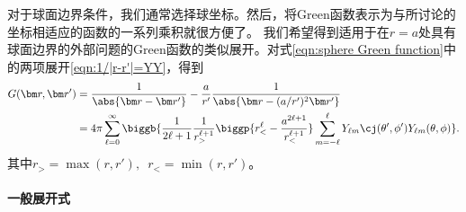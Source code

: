 对于球面边界条件，我们通常选择球坐标。然后，将Green函数表示为与所讨论的坐标相适应的函数的一系列乘积就很方便了。
我们希望得到适用于在$r = a$处具有球面边界的外部问题的Green函数的类似展开。对式\eqref{eqn:sphere Green function}中的两项展开\eqref{eqn:1/|r-r'|=YY}，得到
\begin{align}
    \notag
    G(\bm r,\bm r')&=\frac1{\abs{\bm r-\bm r'}}-\frac a{r'}\frac1{\abs{\bm r-(a/r')^2\bm r'}}\\
    \label{eqn:Green YY}
    &=4\pi\sum_{\ell=0}^\infty\biggb{\frac1{2\ell+1}\frac1{r_>^{\ell+1}}\biggp{r_<^\ell-\frac{a^{2\ell+1}}{r_<^{\ell+1}}}\sum_{m=-\ell}^\ell Y_{\ell m}\cj(\theta',\phi')Y_{\ell m}(\theta,\phi)}.
\end{align}
其中$r_>=\max(r,r'),\enspace r_<=\min(r,r')$。%

\paragraph{一般展开式}


